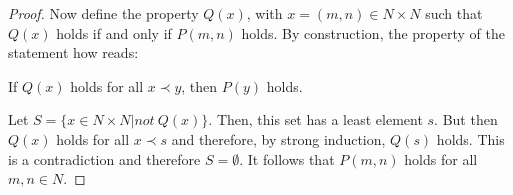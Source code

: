 \begin{proof}
\vspace{1em}

Now define the property $Q(x)$, with $x = (m,n) \in N \times N$ such that $Q(x)$ holds if and only if $P(m, n)$ holds. By construction, the property of the statement how reads:

If $Q(x)$ holds for all $x \prec y$, then $P(y)$ holds.

Let $S = \{x \in N \times N| not~Q(x)\}$. Then, this set has a least element $s$. But then $Q(x)$ holds for all $x \prec s$ and therefore, by strong induction, $Q(s)$ holds. This is a contradiction and therefore $S = \emptyset$. It follows that $P(m, n)$ holds for all $m, n \in  N$.

\end{proof}



